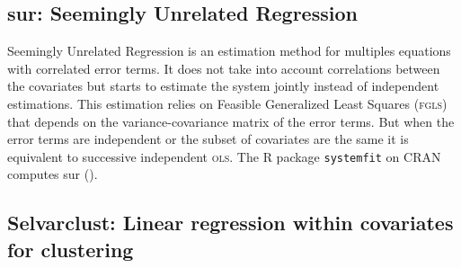 \documentclass[12pt,a4paper]{report}
\begin{document}
		\subsection{{\sc sur}: Seemingly Unrelated Regression}		%
		Seemingly Unrelated Regression \cite{SURzellner} is an estimation method for multiples equations with correlated error terms. It does not take into account correlations between the covariates but starts to estimate the system jointly instead of independent estimations. This estimation relies on Feasible Generalized Least Squares (\textsc{fgls}) that depends on the variance-covariance matrix of the error terms. But when the error terms are independent or the subset of covariates are the same it is equivalent to successive independent \textsc{ols}. The R package {\tt systemfit} on CRAN computes {\sc sur} (\cite{packagesystemfit}). 
%			
%
		\subsection{Selvarclust: Linear regression within covariates for clustering}		%
\end{document}
